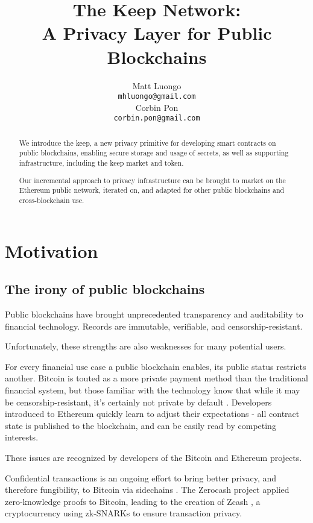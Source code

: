 \documentclass[11pt]{article}
\title{The Keep Network:\protect\\A Privacy Layer for Public Blockchains}
\author{Matt Luongo \\
  {\tt mhluongo@gmail.com} \\\And
  Corbin Pon \\
  {\tt corbin.pon@gmail.com} \\}
\date{}
\begin{document}
\thispagestyle{fancy}

\maketitle

\begin{abstract}

  We introduce the keep, a new privacy primitive for developing smart
  contracts on public blockchains, enabling secure storage and usage
  of secrets, as well as supporting infrastructure, including the keep
  market and token.

  Our incremental approach to privacy infrastructure can be brought
  to market on the Ethereum public network, iterated on, and adapted
  for other public blockchains and cross-blockchain use.

\end{abstract}

\section{Motivation}

\subsection{The irony of public blockchains}

Public blockchains have brought unprecedented transparency and
auditability to financial technology. Records are immutable,
verifiable, and censorship-resistant.

Unfortunately, these strengths are also weaknesses for many potential
users.

For every financial use case a public blockchain enables, its public
status restricts another. Bitcoin is touted as a more private payment
method than the traditional financial system, but those familiar with
the technology know that while it may be censorship-resistant, it's
certainly not private by default \cite{bitcoinPrivacy}. Developers
introduced to Ethereum quickly learn to adjust their expectations
\cite{ethereumStackexchange}- all contract state is published to the
blockchain, and can be easily read by competing interests.

These issues are recognized by developers of the Bitcoin and Ethereum
projects.

Confidential transactions \cite{confidentialTransactions} is an
ongoing effort to bring better privacy, and therefore fungibility, to
Bitcoin via sidechains \cite{confidentialTransactionsElements}. The
Zerocash project \cite{zerocash} applied zero-knowledge proofs to
Bitcoin, leading to the creation of Zcash \cite{zcash}, a
cryptocurrency using zk-SNARKs to ensure transaction privacy.
\end{document}
